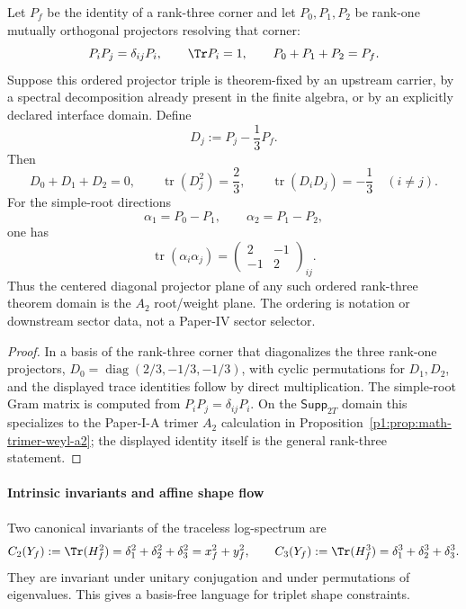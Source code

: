 \documentclass[12pt,a4paper]{article}
\begin{document}
\begin{corollary}
\label{p4:cor:rank-three-a2-defect-plane}
Let \(P_f\) be the identity of a rank-three corner and let
\(P_0,P_1,P_2\) be rank-one mutually orthogonal projectors resolving that
corner:
\[
P_iP_j=\delta_{ij}P_i,
\qquad
\Tr P_i=1,
\qquad
P_0+P_1+P_2=P_f.
\]
Suppose this ordered projector triple is theorem-fixed by an upstream
carrier, by a spectral decomposition already present in the finite algebra,
or by an explicitly declared interface domain.  Define
\[
D_j:=P_j-\frac13P_f.
\]
Then
\[
D_0+D_1+D_2=0,
\qquad
\operatorname{tr}(D_j^2)=\frac23,
\qquad
\operatorname{tr}(D_iD_j)=-\frac13\quad(i\ne j).
\]
For the simple-root directions
\[
\alpha_1=P_0-P_1,
\qquad
\alpha_2=P_1-P_2,
\]
one has
\[
\operatorname{tr}(\alpha_i\alpha_j)=
\begin{pmatrix}
2&-1\\
-1&2
\end{pmatrix}_{ij}.
\]
Thus the centered diagonal projector plane of any such ordered rank-three theorem domain is the \(A_2\) root/weight plane.  The ordering is notation or downstream sector data, not a Paper-IV sector selector.
\end{corollary}


\begin{proof}
In a basis of the rank-three corner that diagonalizes the three rank-one
projectors,
\(D_0=\operatorname{diag}(2/3,-1/3,-1/3)\), with cyclic permutations for
\(D_1,D_2\), and the displayed trace identities follow by direct
multiplication.
The simple-root Gram matrix is computed from \(P_iP_j=\delta_{ij}P_i\).
On the \(\mathsf{Supp}_{2T}\) domain this specializes to the
Paper-I-A trimer \(A_2\) calculation in
Proposition~\ref{p1:prop:math-trimer-weyl-a2}; the displayed identity itself
is the general rank-three statement.
\end{proof}



\paragraph{Intrinsic invariants and affine shape flow}
\label{p4:sec:part2-threelevel-invariants}

Two canonical invariants of the traceless log-spectrum are
\begin{equation}
\label{p4:eq:part2-casimirs}
C_2(Y_f):=\Tr(H_f^2)=\delta_1^2+\delta_2^2+\delta_3^2=x_f^2+y_f^2,
\qquad
C_3(Y_f):=\Tr(H_f^3)=\delta_1^3+\delta_2^3+\delta_3^3.
\end{equation}
They are invariant under unitary conjugation and under permutations of eigenvalues.
This gives a basis-free language for triplet shape constraints.
\end{document}
